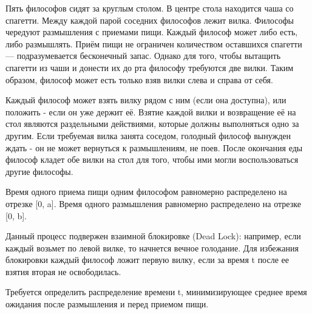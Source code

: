 \begin{problem}
Пять философов сидят за круглым столом. В центре стола находится чаша со
спагетти. Между каждой парой соседних философов лежит вилка. Философы чередуют размышления с приемами пищи. Каждый философ может либо есть, либо размышлять. Приём пищи не ограничен
количеством оставшихся спагетти — подразумевается бесконечный запас. Однако
для того, чтобы вытащить спагетти из чаши и донести их до рта философу требуются
две вилки. Таким образом, философ может есть только взяв вилки слева и справа от
себя. 

Каждый философ может взять вилку рядом с ним (если она доступна), или положить
- если он уже держит её. Взятие каждой вилки и возвращение её на стол являются
раздельными действиями, которые должны выполняться одно за другим. Если
требуемая вилка занята соседом, голодный философ вынужден ждать - он не
может вернуться к размышлениям, не поев. После окончания еды философ кладет
обе вилки на стол для того, чтобы ими могли воспользоваться другие философы.

Время одного приема пищи одним философом равномерно распределено на отрезке [0, a]. 
Время одного размышления равномерно распределено на отрезке [0, b].

Данный процесс подвержен взаимной блокировке (Dead Lock): например, если каждый возьмет по левой вилке, то начнется вечное голодание. Для избежания блокировки каждый философ ложит первую вилку, если за время t после ее взятия вторая не освободилась.

Требуется определить распределение времени t, минимизирующее среднее время ожидания после размышления и перед приемом пищи.

\end{problem}


